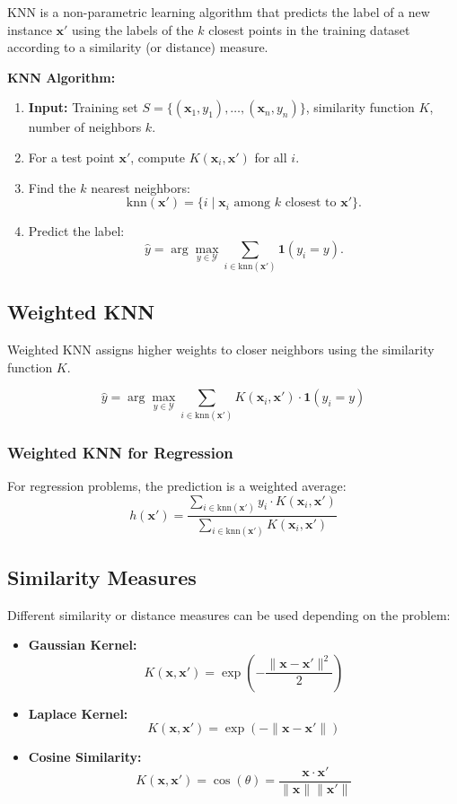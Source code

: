 KNN is a non-parametric learning algorithm that predicts the label of a new instance $\mathbf{x}'$ using the labels of the $k$ closest points in the training dataset according to a similarity (or distance) measure.

\begin{algobox}
\textbf{KNN Algorithm:}
\begin{enumerate}
    \item \textbf{Input:} Training set $S = \{(\mathbf{x}_1,y_1), \dots, (\mathbf{x}_n,y_n)\}$, similarity function $K$, number of neighbors $k$.
    \item For a test point $\mathbf{x}'$, compute $K(\mathbf{x}_i,\mathbf{x}')$ for all $i$.
    \item Find the $k$ nearest neighbors:
    \[
    \text{knn}(\mathbf{x}') = \{ i \mid \mathbf{x}_i \text{ among $k$ closest to } \mathbf{x}' \}.
    \]
    \item Predict the label:
    \[
    \hat{y} = \arg\max_{y \in \mathcal{Y}} \sum_{i \in \text{knn}(\mathbf{x}')} \mathbf{1}(y_i = y).
    \]
\end{enumerate}
\end{algobox}

\subsection{Weighted KNN}

Weighted KNN assigns higher weights to closer neighbors using the similarity function $K$.

\[
\hat{y} = \arg\max_{y \in \mathcal{Y}} \sum_{i \in \text{knn}(\mathbf{x}')} K(\mathbf{x}_i, \mathbf{x}') \cdot \mathbf{1}(y_i = y)
\]

\subsubsection*{Weighted KNN for Regression}
For regression problems, the prediction is a weighted average:
\[
h(\mathbf{x}') = 
\frac{\displaystyle\sum_{i \in \text{knn}(\mathbf{x}')} y_i \cdot K(\mathbf{x}_i, \mathbf{x}')}{\displaystyle\sum_{i \in \text{knn}(\mathbf{x}')} K(\mathbf{x}_i, \mathbf{x}')}
\]

\subsection{Similarity Measures}

Different similarity or distance measures can be used depending on the problem:
\begin{itemize}
    \item \textbf{Gaussian Kernel:} 
    \[
    K(\mathbf{x}, \mathbf{x}') = \exp\left(-\frac{\|\mathbf{x} - \mathbf{x}'\|^2}{2}\right)
    \]
    \item \textbf{Laplace Kernel:} 
    \[
    K(\mathbf{x}, \mathbf{x}') = \exp\left(-\|\mathbf{x} - \mathbf{x}'\|\right)
    \]
    \item \textbf{Cosine Similarity:} 
    \[
    K(\mathbf{x}, \mathbf{x}') = \cos(\theta) = \frac{\mathbf{x} \cdot \mathbf{x}'}{\|\mathbf{x}\| \|\mathbf{x}'\|}
    \]
\end{itemize}

